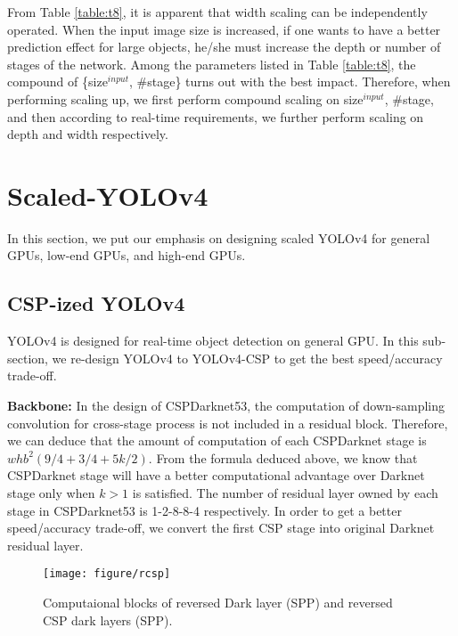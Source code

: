 \documentclass[10pt,twocolumn,letterpaper]{article}
\begin{document}
From Table \ref{table:t8}, it is apparent that width scaling can be independently operated.  When the input image size is increased, if one wants to have a better prediction effect for large objects, he/she must increase the depth or number of stages of the network.  Among the parameters listed in Table \ref{table:t8}, the compound of \{size$^{input}$, \#stage\} turns out with the best impact.  Therefore, when performing scaling up, we first perform compound scaling on {size$^{input}$, \#stage}, and then according to real-time requirements, we further perform scaling on depth and width respectively.

\section{Scaled-YOLOv4}

In this section, we put our emphasis on designing scaled YOLOv4 for general GPUs, low-end GPUs, and high-end GPUs.

\subsection{CSP-ized YOLOv4}

YOLOv4 is designed for real-time object detection on general GPU.  In this sub-section, we re-design YOLOv4 to YOLOv4-CSP to get the best speed/accuracy trade-off.

\noindent
\textbf{Backbone:} In the design of CSPDarknet53, the computation of down-sampling convolution for cross-stage process is not included in a residual block.  Therefore, we can deduce that the amount of computation of each CSPDarknet stage is $wh{b}^{2}(9/4+3/4+5k/2)$.  From the formula deduced above, we know that CSPDarknet stage will have a better computational advantage over Darknet stage only when $k > 1$ is satisfied.  The number of residual layer owned by each stage in CSPDarknet53 is 1-2-8-8-4 respectively.  In order to get a better speed/accuracy trade-off, we convert the first CSP stage into original Darknet residual layer.

\begin{figure}[h]
	\begin{center}
		\texttt{[image: figure/rcsp]}
	\end{center}
	\vspace{-4mm}
	\caption{Computaional blocks of reversed Dark layer (SPP) and reversed CSP dark layers (SPP).}
	\label{fig:rcsp}
\end{figure}
\end{document}
